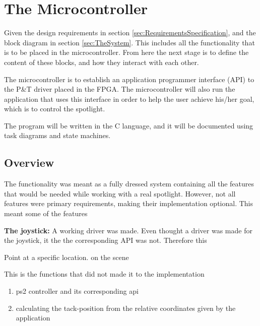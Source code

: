 \section{The Microcontroller}
\label{sec:TheMicrocontroller}

 Given the design requirements in section \ref{sec:RequirementsSpecification}, and the block diagram in section \ref{sec:TheSystem}. This includes all the functionality that is to be placed in the microcontroller. From here the next stage is to define the content of these blocks, and how they interact with each other. 
 
 The microcontroller is to establish an application programmer interface (API) to the P\&T driver placed in the FPGA. The microcontroller will also run the application that uses this interface in order to help the user achieve his/her goal, which is to control the spotlight.
 
 The program will be written in the C language, and it will be documented using task diagrams and state machines. 
















\subsection{Overview}
The functionality was meant as a fully dressed system containing all the features that would be needed while working with a real spotlight. However, not all features were primary requirements, making their implementation optional. This meant some of the features
 
\textbf{The joystick:} A working driver was made. Even thought a driver was made for the joystick, it the the corresponding API was not. Therefore this 

Point at a specific location. on the scene

This is the functions that did not made it to the implementation

\begin{enumerate}[noitemsep]
	
	\item ps2 controller and its corresponding api
	
	\item calculating the tack-position from the relative coordinates given by the application  
	
	

\end{enumerate}